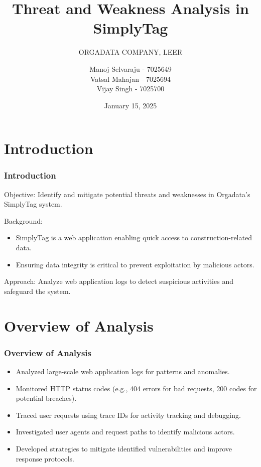 \documentclass[10pt, a4paper]{beamer}
\title{Threat and Weakness Analysis in SimplyTag}
\subtitle{ORGADATA COMPANY, LEER}
\author{
		Manoj Selvaraju - 7025649 \\ 
		Vatsal Mahajan - 7025694\\ 
		Vijay Singh - 7025700
}
\date{January 15, 2025}
\begin{document}
	


	    \section{Introduction}
		\begin{frame}
		\frametitle{Introduction}
		
		\begin{block}{Objective:}
			Identify and mitigate potential threats and weaknesses in Orgadata’s SimplyTag system.
		\end{block}
		
		
		\begin{block}{Background:}
			\begin{itemize}
				\item SimplyTag is a web application enabling quick access to construction-related data.
				\item Ensuring data integrity is critical to prevent exploitation by malicious actors.
			\end{itemize}
		\end{block}
		
		\begin{block}{Approach: }
			Analyze web application logs to detect suspicious activities and safeguard the system.
		\end{block}
		
		
	\end{frame}
	
	\section{Overview of Analysis}
	\begin{frame}
		\frametitle{Overview of Analysis}
		
		\begin{block}{}
			\begin{itemize}
				\item Analyzed large-scale web application logs for patterns and anomalies.
				\item Monitored HTTP status codes (e.g., 404 errors for bad requests, 200 codes for potential breaches).
				\item Traced user requests using trace IDs for activity tracking and debugging.
				\item Investigated user agents and request paths to identify malicious actors.
				\item Developed strategies to mitigate identified vulnerabilities and improve response protocols.
			\end{itemize}
		\end{block}
		
	\end{frame}
	
\end{document}
